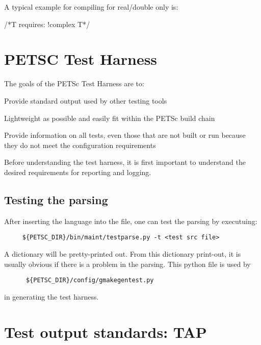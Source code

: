 A typical example for compiling for real/double only is:
\begin{outputlisting}
/*T
  requires: !complex
T*/
\end{outputlisting}

\section{PETSC Test Harness%
  \label{petsc-test-harness}%
}

The goals of the PETSc Test Harness are to:
%
\begin{tightitemize}
\item Provide standard output used by other testing tools

\item Lightweight as possible and easily fit within the PETSc build chain

\item Provide information on all tests, even those that are not built or
run because they do not meet the configuration requirements
\end{tightitemize}

Before understanding the test harness, it is first important to
understand the desired requirements for reporting and logging.


\subsection{Testing the parsing%
  \label{testing-the-parsing}%
}

After inserting the language into the file, one can test the parsing
by executuing:
%
\begin{verbatim}
     ${PETSC_DIR}/bin/maint/testparse.py -t <test src file>
\end{verbatim}

A dictionary will be pretty-printed out.  From this dictionary
print-out, it is usually obvious if there is a problem in the parsing.
This python file is used by 
\begin{verbatim}
      ${PETSC_DIR}/config/gmakegentest.py
\end{verbatim}
in generating the test harness.


\section{Test output standards: TAP}%
  \label{test-output-standards-tap}%

